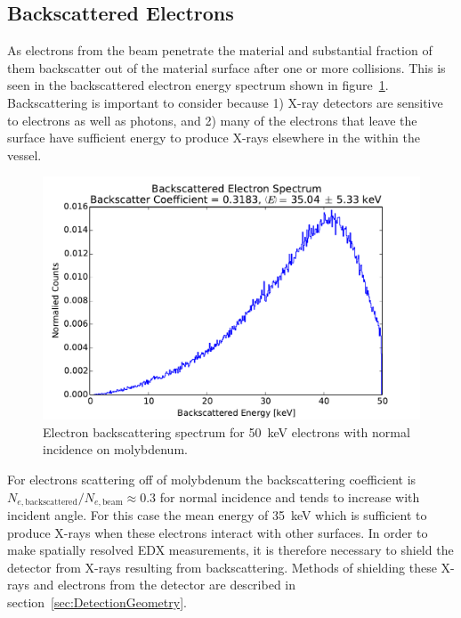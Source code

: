 \documentclass[12pt,letterpaper,final]{article}
\begin{document}
\subsection{Backscattered Electrons}

As electrons from the beam penetrate the material and substantial fraction of them backscatter out of the material surface after one or more collisions.  This is seen in the backscattered electron energy spectrum shown in figure~\ref{fig:BackscatteringSpectrum}. Backscattering is important to consider because 1) X-ray detectors are sensitive to electrons as well as photons, and 2) many of the electrons that leave the surface have sufficient energy to produce X-rays elsewhere in the within the vessel.

\begin{figure}[!h]
 \centering
  \includegraphics[width=\columnwidth]{figures/MolybdenumBackscatteringSpectrum.pdf}
 \caption{Electron backscattering spectrum for 50~keV electrons with normal incidence on molybdenum.} 
 \label{fig:BackscatteringSpectrum}
\end{figure}

For electrons scattering off of molybdenum the backscattering coefficient is $N_{e,\mathrm{backscattered}}/N_{e,\mathrm{beam}} \approx 0.3$ for normal incidence and tends to increase with incident angle.  For this case the mean energy of 35~keV which is sufficient to produce X-rays when these electrons interact with other surfaces. In order to make spatially resolved EDX measurements, it is therefore necessary to shield the detector from X-rays resulting from backscattering. Methods of shielding these X-rays and electrons from the detector are described in section~\ref{sec:DetectionGeometry}.
\end{document}
